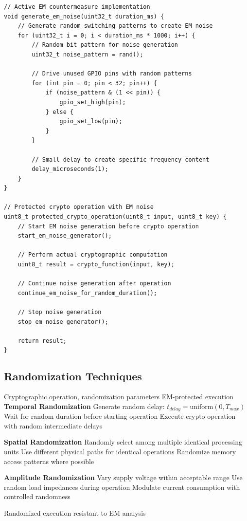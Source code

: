 \documentclass[11pt,a4paper]{article}
\theoremstyle{definition}
\begin{document}
\begin{lstlisting}[caption={Active EM Noise Generation}]
// Active EM countermeasure implementation
void generate_em_noise(uint32_t duration_ms) {
    // Generate random switching patterns to create EM noise
    for (uint32_t i = 0; i < duration_ms * 1000; i++) {
        // Random bit pattern for noise generation
        uint32_t noise_pattern = rand();
        
        // Drive unused GPIO pins with random patterns
        for (int pin = 0; pin < 32; pin++) {
            if (noise_pattern & (1 << pin)) {
                gpio_set_high(pin);
            } else {
                gpio_set_low(pin);
            }
        }
        
        // Small delay to create specific frequency content
        delay_microseconds(1);
    }
}

// Protected crypto operation with EM noise
uint8_t protected_crypto_operation(uint8_t input, uint8_t key) {
    // Start EM noise generation before crypto operation
    start_em_noise_generator();
    
    // Perform actual cryptographic computation
    uint8_t result = crypto_function(input, key);
    
    // Continue noise generation after operation
    continue_em_noise_for_random_duration();
    
    // Stop noise generation
    stop_em_noise_generator();
    
    return result;
}
\end{lstlisting}

\subsection{Randomization Techniques}

\begin{algorithm}
\caption{Temporal and Spatial EM Randomization}
\begin{algorithmic}[1]
\REQUIRE Cryptographic operation, randomization parameters
\ENSURE EM-protected execution
\STATE \textbf{Temporal Randomization}
\STATE Generate random delay: $t_{delay} = \text{uniform}(0, T_{max})$
\STATE Wait for random duration before starting operation
\STATE Execute crypto operation with random intermediate delays

\STATE \textbf{Spatial Randomization}
\STATE Randomly select among multiple identical processing units
\STATE Use different physical paths for identical operations
\STATE Randomize memory access patterns where possible

\STATE \textbf{Amplitude Randomization}  
\STATE Vary supply voltage within acceptable range
\STATE Use random load impedances during operation
\STATE Modulate current consumption with controlled randomness

\RETURN Randomized execution resistant to EM analysis
\end{algorithmic}
\end{algorithm}
\end{document}
